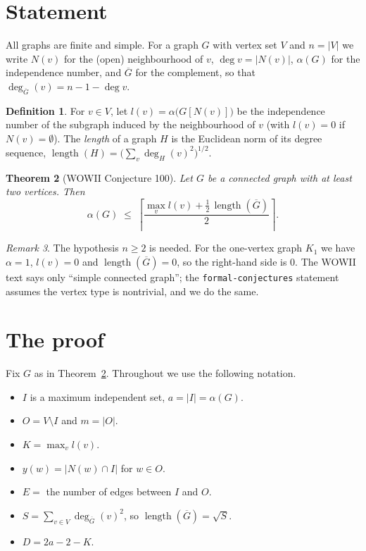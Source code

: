 \documentclass[11pt]{article}
\newtheorem{theorem}{Theorem}
\theoremstyle{definition}
\newtheorem{definition}[theorem]{Definition}
\theoremstyle{remark}
\newtheorem{remark}[theorem]{Remark}
\newcommand{\Gbar}{\overline{G}}
\newcommand{\lng}{\operatorname{length}}
\newcommand{\ceil}[1]{\left\lceil #1 \right\rceil}
\begin{document}
\section{Statement}

All graphs are finite and simple. For a graph $G$ with vertex set $V$ and $n = |V|$ we
write $N(v)$ for the (open) neighbourhood of $v$, $\deg v = |N(v)|$,
$\alpha(G)$ for the independence number, and $\Gbar$ for the complement, so
that $\deg_{\Gbar}(v) = n-1-\deg v$.

\begin{definition}
For $v \in V$, let $l(v) = \alpha\bigl(G[N(v)]\bigr)$ be the independence
number of the subgraph induced by the neighbourhood of $v$ (with $l(v)=0$
if $N(v)=\emptyset$). The \emph{length} of a graph $H$ is the Euclidean norm
of its degree sequence,
$\lng(H) = \bigl(\sum_{v} \deg_H(v)^2\bigr)^{1/2}$.
\end{definition}

\begin{theorem}[WOWII Conjecture 100]\label{thm:main}
Let $G$ be a connected graph with at least two vertices. Then
\[
  \alpha(G) \;\le\; \ceil{\frac{\max_{v} l(v) + \tfrac12\,\lng(\Gbar)}{2}}.
\]
\end{theorem}

\begin{remark}
The hypothesis $n \ge 2$ is needed. For the one-vertex graph $K_1$ we have
$\alpha = 1$, $l(v) = 0$ and $\lng(\Gbar) = 0$, so the right-hand side is
$0$. The WOWII text says only ``simple connected graph''; the
\texttt{formal-conjectures} statement assumes the vertex type is nontrivial,
and we do the same.
\end{remark}

\section{The proof}

Fix $G$ as in Theorem~\ref{thm:main}. Throughout we use the following
notation.
\begin{itemize}
\item $I$ is a maximum independent set, $a = |I| = \alpha(G)$.
\item $O = V \setminus I$ and $m = |O|$.
\item $K = \max_v l(v)$.
\item $y(w) = |N(w) \cap I|$ for $w \in O$.
\item $E = $ the number of edges between $I$ and $O$.
\item $S = \sum_{v \in V} \deg_{\Gbar}(v)^2$, so $\lng(\Gbar) = \sqrt{S}$.
\item $D = 2a - 2 - K$.
\end{itemize}
\end{document}
